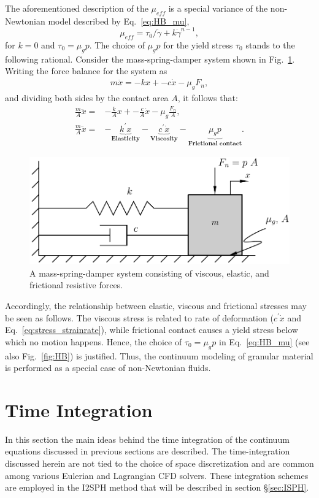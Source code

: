 The aforementioned description of the $\mu_{eff}$ is a special variance of the non-Newtonian model described by Eq.~\ref{eq:HB_mu}, 
\begin{equation*}
\mu_{eff}= \tau_0/\dot{\gamma}+k \dot{\gamma}^{n-1},
\end{equation*}
for $k=0$ and $\tau_0=\mu_g p$. The choice of $\mu_g p$ for the yield stress $\tau_0$ stands to the following rational. Consider the mass-spring-damper system shown in Fig.~\ref{fig:MSD}. Writing the force balance for the system as
\begin{align}
m \ddot{x} = -k x + -c \dot{x} - \mu_g F_n,
\end{align}
and dividing both sides by the contact area $A$, it follows that:
\begin{align}
\frac{m}{A} \ddot{x} =& -\frac{k}{A} x + -\frac{c}{A}\dot{x} - \mu_g \frac{F_n}{A}, \nonumber\\
\frac{m}{A} \ddot{x} =& 
-\underbrace{k^{\prime} x}_{\textbf{Elasticity}}
-\underbrace{c^{\prime} \dot{x}}_{\textbf{Viscosity}}
-\underbrace{\mu_g p}_{\textbf{Frictional contact}}.
\end{align}
\begin{figure}[H]
	\begin{center}
		\includegraphics[width=.5\linewidth]{images/Mass_Spring_Damper.pdf}
	\end{center}
	\caption{A mass-spring-damper system consisting of viscous, elastic, and frictional resistive forces.}
	\label{fig:MSD}
\end{figure}

Accordingly, the relationship between elastic, viscous and frictional stresses may be seen as follows. The viscous stress is related to rate of deformation ($c^{\prime}\dot{x}$ and Eq.~\ref{eq:stress_strainrate}), while frictional contact causes a yield stress below which no motion happens. Hence, the choice of $\tau_0=\mu_g p$ in Eq.~\ref{eq:HB_mu} (see also Fig.~\ref{fig:HB}) is justified. Thus, the continuum modeling of granular material is performed as a special case of non-Newtonian fluids. 

\section{Time Integration}
In this section the main ideas behind the time integration of the continuum equations discussed in previous sections are described. The time-integration discussed herein are not tied to the choice of space discretization and are common among various Eulerian and Lagrangian CFD solvers. These integration schemes are employed in the I2SPH method that will be described in section \S\ref{sec:ISPH}.


